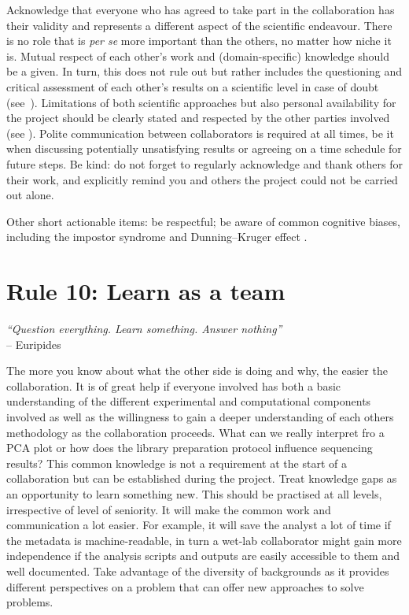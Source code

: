\documentclass{article}
\begin{document}
Acknowledge that everyone who has agreed to take part in the collaboration has their validity and represents a different aspect of the scientific endeavour. There is no role that is \textit{per se} more important than the others, no matter how niche it is. Mutual respect of each other’s work and (domain-specific) knowledge should be a given. In turn, this does not rule out but rather includes the questioning and critical assessment of each other's results on a scientific level in case of doubt (see~). Limitations of both scientific approaches but also personal availability for the project should be clearly stated and respected by the other parties involved (see ). Polite communication between collaborators is required at all times, be it when discussing potentially unsatisfying results or agreeing on a time schedule for future steps. Be kind: do not forget to regularly acknowledge and thank others for their work, and explicitly remind you and others the project could not be carried out alone.

Other short actionable items: be respectful; be aware of common cognitive biases, including the impostor syndrome \cite{clance1978imposter} and Dunning–Kruger effect \cite{kruger1999unskilled}.

\section*{Rule 10: Learn as a team} %
\label{rule10_learn}

\begin{flushright}
\rightskip=1cm\textit{``Question everything. Learn something. Answer nothing''} \\
\vspace{.2em}
\rightskip=0cm -- Euripides 
\end{flushright}

The more you know about what the other side is doing and why, the easier the collaboration. It is of great help if everyone involved has both a basic understanding of the different experimental and computational components involved as well as the willingness to gain a deeper understanding of each others methodology as the collaboration proceeds. What can we really interpret fro a PCA plot or how does the library preparation protocol influence sequencing results? This common knowledge is not a requirement at the start of a collaboration but can be established during the project. Treat knowledge gaps as an opportunity to learn something new. This should be practised at all levels, irrespective of level of seniority. It will make the common work and communication a lot easier. For example, it will save the analyst a lot of time if the metadata is machine-readable, in turn a wet-lab collaborator might gain more independence if the analysis scripts and outputs are easily accessible to them and well documented. Take advantage of the diversity of backgrounds as it provides different perspectives on a problem that can offer new approaches to solve problems.
\end{document}

